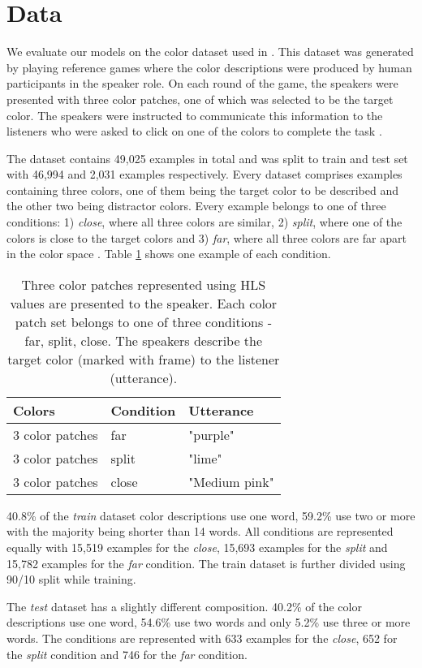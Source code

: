 \section{Data}

We evaluate our models on the color dataset used in \citep{monroe-2017-colors}. This dataset was generated by playing reference games where the color descriptions were produced by human participants in the speaker role. On each round of the game, the speakers were presented with three color patches, one of which was selected to be the target color. The speakers were instructed to communicate this information to the listeners who were asked to click on one of the colors to complete the task \citep{monroe-2017-colors}.

\par
The dataset contains 49,025 examples in total and was split to train and test set with 46,994 and 2,031 examples respectively. Every dataset comprises examples containing three colors, one of them being the target color to be described and the other two being distractor colors. Every example belongs to one of three conditions: 1) \emph{close}, where all three colors are similar, 2) \emph{split}, where one of the colors is close to the target colors and 3) \emph{far}, where all three colors are far apart in the color space \citep{monroe-2017-colors}. Table \ref{table:colors} shows one example of each condition.

\begin{table}[ht]
\centering
\renewcommand{\arraystretch}{1}
\begin{tabular}{|l|l|l|}

  \hline
  Colors & Condition & Utterance \\
  \hline
  3 color patches & far & "purple" \\
  \hline
  3 color patches & split & "lime" \\
  \hline
  3 color patches & close & "Medium pink" \\
  \hline

\end{tabular}
\caption[Colors]{Three color patches represented using HLS values are presented to the speaker. Each color patch set belongs to one of three conditions - far, split, close. The speakers describe the target color (marked with frame) to the listener (utterance).}
\label{table:colors}
\end{table}

\par
40.8\% of the \emph{train} dataset color descriptions use one word, 59.2\% use two or more with the majority being shorter than 14 words. All conditions are represented equally with 15,519 examples for the \emph{close}, 15,693 examples for the \emph{split} and 15,782 examples for the \emph{far} condition. The train dataset is further divided using 90/10 split while training.

\par
The \emph{test} dataset has a slightly different composition. 40.2\% of the color descriptions use one word, 54.6\% use two words and only 5.2\% use three or more words. The conditions are represented with 633 examples for the \emph{close}, 652 for the \emph{split} condition and 746 for the \emph{far} condition.